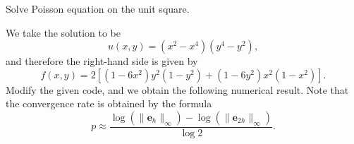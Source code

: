 \begin{pro}
  Solve Poisson equation on the unit square.
\end{pro}
\begin{sol}
  We take the solution to be
  \begin{displaymath}
    u(x, y) = (x^2 - x^4)(y^4 - y^2),
  \end{displaymath}
  and therefore the right-hand side is given by
  \begin{displaymath}
    f(x, y) = 2\left[(1-6x^2)y^2(1-y^2)+(1-6y^2)x^2(1-x^2)\right].
  \end{displaymath}
  Modify the given code,
  and we obtain the following numerical result.
  Note that the convergence rate is obtained by the formula
  \begin{displaymath}
    p \approx
    \frac{\log(\|\mathbf{e}_h\|_{\infty}) - \log(\|\mathbf{e}_{2h}\|_{\infty})}{\log
    2}.
  \end{displaymath}
  \begin{figure}[H]
  \centering
  \hfill
  \hfill
  \hfill
\end{figure}
\end{sol}
